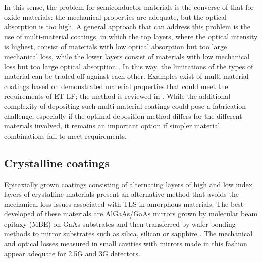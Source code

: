 In this sense, the problem for semiconductor materials is the converse of that for oxide materials: the mechanical properties are adequate, but the optical absorption is too high. A general approach that can address this problem is the use of multi-material coatings, in which the top layers, where the optical intensity is highest, consist of materials with low optical absorption but too large mechanical loss, while the lower layers consist of materials with low mechanical loss but too large optical absorption \cite{yam2015multimaterial,steinlechner2015thermal}. In this way, the limitations of the types of material can be traded off against each other. Examples exist of multi-material coatings based on demonstrated material properties that could meet the requirements of ET-LF; the method is reviewed in \cite{Craig2018ETmultimaterialDCC}. While the additional complexity of depositing such multi-material coatings could pose a fabrication challenge, especially if the optimal deposition method differs for the different materials involved, it remains an important option if simpler material combinations fail to meet requirements.

\subsection{Crystalline coatings}

Epitaxially grown coatings consisting of alternating layers of high and low index layers of crystalline materials present an alternative method that avoids the mechanical loss issues associated with TLS in amorphous materials. The best developed of these materials are AlGaAs/GaAs mirrors grown by molecular beam epitaxy (MBE) on GaAs substrates and then transferred by wafer-bonding methods to mirror substrates such as silica, silicon or sapphire \cite{cole2013tenfold}. The mechanical and optical losses measured in small cavities with mirrors made in this fashion appear adequate for 2.5G and 3G detectors.

